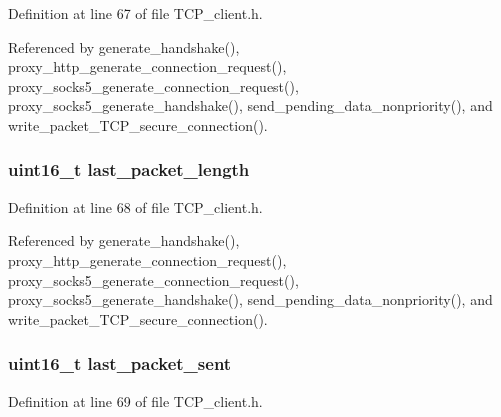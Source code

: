 Definition at line 67 of file T\+C\+P\+\_\+client.\+h.



Referenced by generate\+\_\+handshake(), proxy\+\_\+http\+\_\+generate\+\_\+connection\+\_\+request(), proxy\+\_\+socks5\+\_\+generate\+\_\+connection\+\_\+request(), proxy\+\_\+socks5\+\_\+generate\+\_\+handshake(), send\+\_\+pending\+\_\+data\+\_\+nonpriority(), and write\+\_\+packet\+\_\+\+T\+C\+P\+\_\+secure\+\_\+connection().

\hypertarget{struct_t_c_p___client___connection_a78d503fe4c8d935701480b58a0461775}{
\subsubsection[{last\+\_\+packet\+\_\+length}]{\setlength{\rightskip}{0pt plus 5cm}uint16\+\_\+t last\+\_\+packet\+\_\+length}}\label{struct_t_c_p___client___connection_a78d503fe4c8d935701480b58a0461775}


Definition at line 68 of file T\+C\+P\+\_\+client.\+h.



Referenced by generate\+\_\+handshake(), proxy\+\_\+http\+\_\+generate\+\_\+connection\+\_\+request(), proxy\+\_\+socks5\+\_\+generate\+\_\+connection\+\_\+request(), proxy\+\_\+socks5\+\_\+generate\+\_\+handshake(), send\+\_\+pending\+\_\+data\+\_\+nonpriority(), and write\+\_\+packet\+\_\+\+T\+C\+P\+\_\+secure\+\_\+connection().

\hypertarget{struct_t_c_p___client___connection_a80b55fa7d5b8e4c3de6b51c99d7670cc}{
\subsubsection[{last\+\_\+packet\+\_\+sent}]{\setlength{\rightskip}{0pt plus 5cm}uint16\+\_\+t last\+\_\+packet\+\_\+sent}}\label{struct_t_c_p___client___connection_a80b55fa7d5b8e4c3de6b51c99d7670cc}


Definition at line 69 of file T\+C\+P\+\_\+client.\+h.



